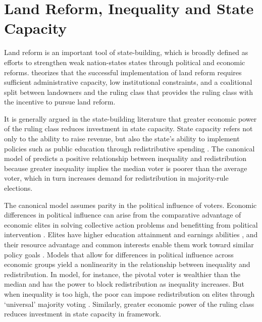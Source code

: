 \section{Land Reform, Inequality and State Capacity}

Land reform is an important tool of state-building, which is broadly defined as efforts to strengthen weak nation-states states through political and economic reforms. \citet{albertus2015autocracy} theorizes that the successful implementation of land reform requires sufficient administrative capacity, low institutional constraints, and a coalitional split between landowners and the ruling class that provides the ruling class with the incentive to pursue land reform.

It is generally argued in the state-building literature that greater economic power of the ruling class reduces investment in state capacity. State capacity refers not only to the ability to raise revenue, but also the state’s ability to implement policies such as public education through redistributive spending \citep{besley2010state}. The canonical model of \citet{meltzer1981rational} predicts a positive relationship between inequality and redistribution because greater inequality implies the median voter is poorer than the average voter, which in turn increases demand for redistribution in majority-rule elections. 

The canonical model assumes parity in the political influence of voters. Economic differences in political influence can arise from the comparative advantage of economic elites in solving collective action problems and benefitting from political intervention \citep{acemoglu2008persistence}. Elites have higher education attainment and earnings abilities \citep{bourguignon2000oligarchy}, and their resource advantage and common interests enable them work toward similar policy goals \citep{winters2009}. Models that allow for differences in political influence across economic groups yield a nonlinearity in the relationship between inequality and redistribution. In  model, for instance, the pivotal voter is wealthier than the median and has the power to block redistribution as inequality increases. But when inequality is too high, the poor can impose redistribution on elites through `universal' majority voting \citep{perotti1993political,saint1993education}. Similarly, greater economic power of the ruling class reduces investment in state capacity in  framework. 


